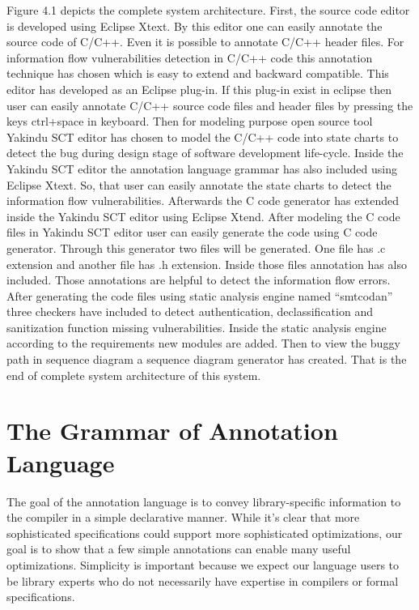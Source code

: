 Figure 4.1 depicts the complete system architecture. First, the source code editor is developed using Eclipse Xtext. By this editor one can easily annotate the source code of C/C++. Even it is possible to annotate C/C++ header files. For information flow vulnerabilities detection in C/C++ code this annotation technique has chosen which is easy to extend and backward compatible. This editor has developed as an Eclipse plug-in. If this plug-in exist in eclipse then user can easily annotate C/C++ source code files and header files by pressing the keys ctrl+space in keyboard. Then for modeling purpose open source tool Yakindu SCT editor \cite{ref_15_yakindu:sct} has chosen to model the C/C++ code into state charts to detect the bug during design stage of software development life-cycle. Inside the Yakindu SCT editor the annotation language grammar has also included using Eclipse Xtext. So, that user can easily annotate the state charts to detect the information flow vulnerabilities. Afterwards the C code generator has extended inside the Yakindu SCT editor using Eclipse Xtend. After modeling the C code files in Yakindu SCT editor user can easily generate the code using C code generator. Through this generator two files will be generated. One file has .c extension and another file has .h extension. Inside those files annotation has also included. Those annotations are helpful to detect the information flow errors. After generating the code files using static analysis engine named \enquote{smtcodan} three checkers have included to detect authentication, declassification and sanitization function missing vulnerabilities. Inside the static analysis engine according to the requirements new modules are added. Then to view the buggy path in sequence diagram a sequence diagram generator has created. That is the end of complete system architecture of this system. 


\section{The Grammar of Annotation Language}

The goal of the annotation language is to convey library-specific information to the compiler in a simple declarative manner. While it's clear that more sophisticated specifications could support more sophisticated optimizations, our goal is to show that a few simple annotations can enable many useful optimizations. Simplicity is important because we expect our language users to be library experts who do not necessarily have expertise in compilers or formal specifications.

